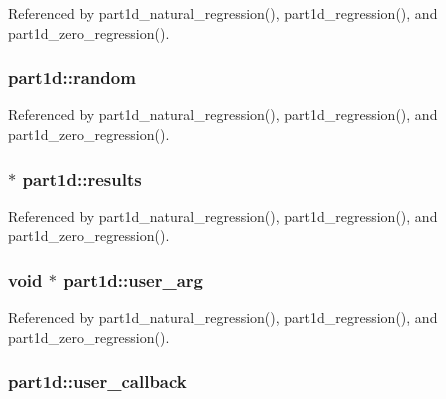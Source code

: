 Referenced by part1d\+\_\+natural\+\_\+regression(), part1d\+\_\+regression(), and part1d\+\_\+zero\+\_\+regression().

\subsubsection[{\texorpdfstring{random}{random}}]{ part1d\+::random}\hypertarget{structpart1d_ae01ce5494186491913b6a1cca714753f}{}\label{structpart1d_ae01ce5494186491913b6a1cca714753f}


Referenced by part1d\+\_\+natural\+\_\+regression(), part1d\+\_\+regression(), and part1d\+\_\+zero\+\_\+regression().

\subsubsection[{\texorpdfstring{results}{results}}]{ $\ast$ part1d\+::results}\hypertarget{structpart1d_a11b93ee9eed232a8d71fc470e96bd21d}{}\label{structpart1d_a11b93ee9eed232a8d71fc470e96bd21d}


Referenced by part1d\+\_\+natural\+\_\+regression(), part1d\+\_\+regression(), and part1d\+\_\+zero\+\_\+regression().

\subsubsection[{\texorpdfstring{user\+\_\+arg}{user_arg}}]{\setlength{\rightskip}{0pt plus 5cm}void $\ast$ part1d\+::user\+\_\+arg}\hypertarget{structpart1d_a68e2266ae8908eddc429ef8ff26b1dbd}{}\label{structpart1d_a68e2266ae8908eddc429ef8ff26b1dbd}


Referenced by part1d\+\_\+natural\+\_\+regression(), part1d\+\_\+regression(), and part1d\+\_\+zero\+\_\+regression().

\subsubsection[{\texorpdfstring{user\+\_\+callback}{user_callback}}]{ part1d\+::user\+\_\+callback}\hypertarget{structpart1d_a1d1094b52704266ac86cf45aa9127d68}{}\label{structpart1d_a1d1094b52704266ac86cf45aa9127d68}


